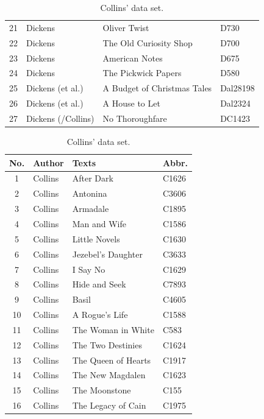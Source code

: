 \documentclass[a4paper,10pt,twoside,fleqn]{article}
\begin{document}
\begin{table}[!htb]
\begin{minipage}{.6\linewidth}
\begin{tabular}{c l l l}
21		& Dickens		& Oliver Twist				& D730        \\
22		& Dickens		&The Old Curiosity Shop			& D700         \\
23		& Dickens		& American Notes			& D675         \\
24		& Dickens		&The Pickwick Papers			& D580           \\
25		& Dickens     (et al.)  & A Budget of Christmas Tales		& Dal28198         \\
26		& Dickens (et al.)	& A House to Let			& Dal2324     \\
27		& Dickens (/Collins)     & No Thoroughfare			& DC1423       \\ \bottomrule
\end{tabular}
\end{minipage}%
\vfill
    \begin{minipage}{.55\linewidth}
      \centering
      \caption{Collins' data set.} %
\label{table:Collins-data}
\small
\begin{tabular}{c l l l } \\\hline \hline
\textbf{No.}	& \textbf{Author} 		& \textbf{Texts} 		& \textbf{Abbr.} \\ \hline
1		& Collins       		& After Dark			& C1626    \\
2		& Collins			& Antonina			& C3606        \\
3		& Collins			& Armadale			& C1895  \\
4		& Collins			& Man and Wife			& C1586      \\
5		& Collins			& Little Novels			& C1630    \\
6		& Collins			& Jezebel's Daughter		& C3633    \\
7		& Collins			& I Say No			& C1629       \\
8		& Collins			& Hide and Seek			& C7893  \\
9		& Collins			& Basil				& C4605 \\
10		& Collins			& A Rogue's Life		& C1588     \\
11		& Collins			& The Woman in White		& C583         \\
12		& Collins			& The Two Destinies		& C1624    \\
13		& Collins			& The Queen of Hearts		& C1917        \\
14		& Collins			& The New Magdalen		& C1623     \\
15		& Collins			& The Moonstone			& C155         \\
16		& Collins			& The Legacy of Cain		& C1975       \\

\end{tabular}
\end{minipage}
\end{table}
\end{document}
